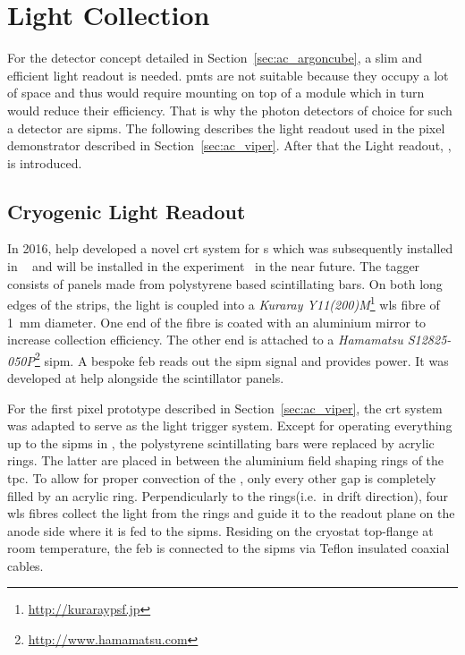 \section{Light Collection}
\label{sec:studies_light-col}

For the \AC{} detector concept detailed in Section~\ref{sec:ac_argoncube}, a slim and efficient light readout is needed.
\glspl{pmt} are not suitable because they occupy a lot of space and thus would require mounting on top of a module which in turn would reduce their efficiency.
That is why the photon detectors of choice for such a detector are \glspl{sipm}.
The following describes the light readout used in the \AC{} pixel demonstrator described in Section~\ref{sec:ac_viper}.
After that the \AC{} Light readout, \AL{}, is introduced.


\subsection{Cryogenic  Light Readout}
\label{sec:studies_light-col_viper}

In 2016, \gls{help} developed a novel \gls{crt} system for \lartpc{}s which was subsequently installed in \uboone{}~\cite{uboone} and will be installed in the \sbnd{} experiment~\cite{sbnd} in the near future.
The tagger consists of panels made from polystyrene based scintillating bars.
On both long edges of the strips, the light is coupled into a \emph{Kuraray Y11(200)M}\footnote{\url{http://kuraraypsf.jp}} \gls{wls} fibre of \SI{1}{\milli\metre} diameter.
One end of the fibre is coated with an aluminium mirror to increase collection efficiency.
The other end is attached to a \emph{Hamamatsu S12825-050P}\footnote{\url{http://www.hamamatsu.com}} \gls{sipm}.
A bespoke \gls{feb} reads out the \gls{sipm} signal and provides power.
It was developed at \gls{help} alongside the scintillator panels\cite{crt_feb}.

For the first pixel prototype described in Section~\ref{sec:ac_viper}, the \gls{crt} system was adapted to serve as the light trigger system.
Except for operating everything up to the \glspl{sipm} in \lar{}, the polystyrene scintillating bars were replaced by acrylic rings.
The latter are placed in between the aluminium field shaping rings of the \gls{tpc}.
To allow for proper convection of the \lar{}, only every other gap is completely filled by an acrylic ring.
Perpendicularly to the rings(i.e.\ in drift direction), four \gls{wls} fibres collect the light from the rings and guide it to the readout plane on the anode side where it is fed to the \glspl{sipm}.
Residing on the cryostat top-flange at room temperature, the \gls{feb} is connected to the \glspl{sipm} via Teflon insulated coaxial cables.


